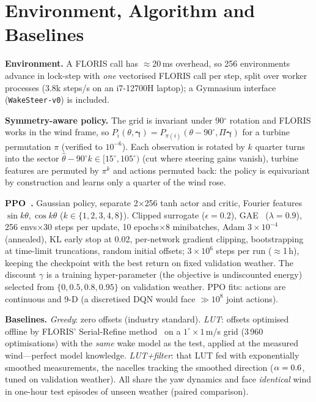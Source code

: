\documentclass[conference,10pt]{IEEEtran}
\begin{document}
\section{Environment, Algorithm and Baselines}
\textbf{Environment.} A FLORIS call has $\approx$20\,ms overhead, so 256 environments advance in lock-step
with \emph{one} vectorised FLORIS call per step, split over worker processes (3.8k steps/s on an i7-12700H
laptop); a Gymnasium interface (\texttt{WakeSteer-v0}) is included.

\textbf{Symmetry-aware policy.} The grid is invariant under 90$^\circ$ rotation and FLORIS works in the wind
frame, so $P_i(\theta,\boldsymbol\gamma)=P_{\pi(i)}(\theta-90^\circ,\Pi\boldsymbol\gamma)$ for a turbine
permutation $\pi$ (verified to $10^{-6}$). Each observation is rotated by $k$ quarter turns into the sector
$\hat\theta-90^\circ k\in[15^\circ,105^\circ)$ (cut where steering gains vanish), turbine features are
permuted by $\pi^k$ and actions permuted back: the policy is equivariant by construction and learns only a
quarter of the wind rose.

\textbf{PPO~\cite{schulman2017}.} Gaussian policy, separate 2$\times$256 tanh actor and critic, Fourier
features $\sin k\theta,\cos k\theta$ ($k\in\{1,2,3,4,8\}$). Clipped surrogate ($\epsilon=0.2$),
GAE~\cite{schulman2016} ($\lambda=0.9$), 256 envs$\times$30 steps per update, 10 epochs$\times$8 minibatches,
Adam $3\!\times\!10^{-4}$ (annealed), KL early stop at 0.02, per-network gradient clipping, bootstrapping at
time-limit truncations, random initial offsets; $3\!\times\!10^6$ steps per run ($\approx$1\,h), keeping the
checkpoint with the best return on fixed validation weather. The discount $\gamma$ is a training
hyper-parameter (the objective is undiscounted energy) selected from $\{0,0.5,0.8,0.95\}$ on validation
weather. PPO fits: actions are continuous and 9-D (a discretised DQN would face $\gg10^8$ joint actions).

\textbf{Baselines.} \emph{Greedy}: zero offsets (industry standard). \emph{LUT}: offsets optimised offline
by FLORIS' Serial-Refine method~\cite{fleming2022sr} on a $1^\circ\times1$\,m/s grid (3\,960 optimisations)
with the \emph{same} wake model as the test, applied at the measured wind---perfect model knowledge.
\emph{LUT+filter}: that LUT fed with exponentially smoothed measurements, the nacelles tracking the smoothed
direction ($\alpha=0.6$, tuned on validation weather). All share the yaw dynamics and face
\emph{identical} wind in \NumEpisodes{} one-hour test episodes of unseen weather (paired comparison).
\end{document}
